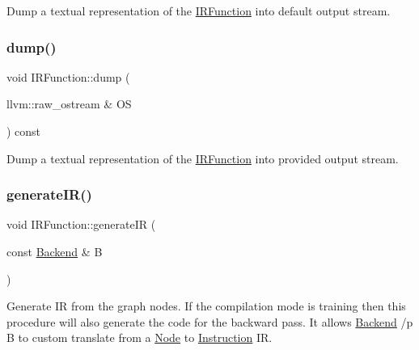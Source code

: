 Dump a textual representation of the \hyperlink{classglow_1_1_i_r_function}{I\+R\+Function} into default output stream. \mbox{\label{classglow_1_1_i_r_function_a04e36395c1598b4e9df9e2c453963fcc}} 
\subsubsection{\texorpdfstring{dump()}{dump()}\hspace{0.1cm}{\footnotesize\ttfamily [2/2]}}
{\footnotesize\ttfamily void I\+R\+Function\+::dump (\begin{DoxyParamCaption}\item[{llvm\+::raw\+\_\+ostream \&}]{OS }\end{DoxyParamCaption}) const}

Dump a textual representation of the \hyperlink{classglow_1_1_i_r_function}{I\+R\+Function} into provided output stream. \mbox{\label{classglow_1_1_i_r_function_ad4e28beb9ad08629d4f9f479dfd2b993}} 
\subsubsection{\texorpdfstring{generate\+I\+R()}{generateIR()}}
{\footnotesize\ttfamily void I\+R\+Function\+::generate\+IR (\begin{DoxyParamCaption}\item[{const \hyperlink{classglow_1_1_backend}{Backend} \&}]{B }\end{DoxyParamCaption})}

Generate IR from the graph nodes. If the compilation mode is \textquotesingle{}training\textquotesingle{} then this procedure will also generate the code for the backward pass. It allows \hyperlink{classglow_1_1_backend}{Backend} /p B to custom translate from a \hyperlink{classglow_1_1_node}{Node} to \hyperlink{classglow_1_1_instruction}{Instruction} IR. \mbox{\label{classglow_1_1_i_r_function_aa92aac0064e63f593b6f6f1c43c1cec7}} 
